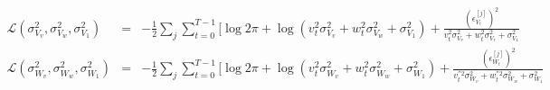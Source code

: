 \documentclass[12pt]{dalcsthesis}
\begin{document}
\begin{eqnarray}
\mathcal{{L}}(\sigma_{V_{v}}^{2},\sigma_{V_{w}}^{2},\sigma_{V_{1}}^{2})&=&-\frac{1}{2}\sum_{j}\sum_{t=0}^{T-1}[\log2\pi+\log(v_{t}^{2}\sigma_{V_{v}}^{2}+w_{t}^{2}\sigma_{V_{w}}^{2}+\sigma_{V_{1}}^{2})+\frac{(\epsilon_{V_{t}}^{[j]})^{2}}{v_{t}^{2}\sigma_{V_{v}}^{2}+w_{t}^{2}\sigma_{V_{r}}^{2}+\sigma_{V_{1}}^{2}}\\
\mathcal{{L}}(\sigma_{W_{v}}^{2},\sigma_{W_{w}}^{2},\sigma_{W_{1}}^{2})&=&-\frac{1}{2}\sum_{j}\sum_{t=0}^{T-1}[\log2\pi+\log(v_{t}^{2}\sigma_{W_{v}}^{2}+w_{t}^{2}\sigma_{W_{w}}^{2}+\sigma_{W_{1}}^{2})+\frac{(\epsilon_{W_{t}}^{[j]})^{2}}{v_{t}^{''2}\sigma_{W_{v}}^{2}+w_{t}^{''2}\sigma_{W_{w}}^{2}+\sigma_{W_{1}}^{2}}
\end{eqnarray}
 
\end{document}
